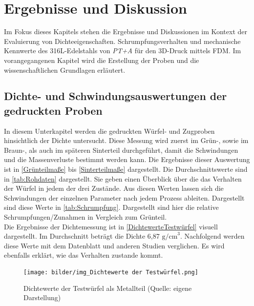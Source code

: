 \chapter{Ergebnisse und Diskussion}

Im Fokus dieses Kapitels stehen die Ergebnisse und Diskussionen im Kontext der Evaluierung von Dichteeigenschaften. Schrumpfungsverhalten und mechanische Kennwerte des 316L-Edelstahls von \textit{PT+A} für den 3D-Druck mittels FDM. Im vorangegangenen Kapitel wird die Erstellung der Proben und die wissenschaftlichen Grundlagen erläutert.

\section{Dichte- und Schwindungsauswertungen der gedruckten Proben}
\label{Dichte- und Schwindung}
In diesem Unterkapitel werden die gedruckten Würfel- und Zugproben hinsichtlich der Dichte untersucht. Diese Messung wird zuerst im Grün-, sowie im Braun-, als auch im späteren Sinterteil durchgeführt, damit die Schwindungen und die Massenverluste bestimmt werden kann. Die Ergebnisse dieser Auswertung ist in \autoref{Grünteilmaße} bis \autoref{Sinterteilmaße} dargestellt. Die Durchschnittswerte sind in \autoref{tab:Rohdaten} dargestellt. Sie geben einen Überblick über die das Verhalten der Würfel in jedem der drei Zustände.
Aus diesen Werten lassen sich die Schwindungen der einzelnen Parameter nach jedem Prozess ableiten. Dargestellt sind diese Werte in \autoref{tab:Schrumpfung}. Dargestellt sind hier die relative Schrumpfungen/Zunahmen in Vergleich zum Grünteil.\\
Die Ergebnisse der Dichtemessung ist in \autoref{DichtewerteTestwürfel} visuell dargestellt. Im Durchschnitt beträgt die Dichte 6,87 \(\text{g/cm}^3\). Nachfolgend werden diese Werte mit dem Datenblatt und anderen Studien verglichen. Es wird ebenfalls erklärt, wie das Verhalten zustande kommt.

\begin{figure}[h] 
  \centering
  \texttt{[image: bilder/img\_Dichtewerte der Testwürfel.png]}
        \caption[Dichtewerte der Testwürfel als Metallteil] {Dichtewerte der Testwürfel als Metallteil (Quelle: eigene Darstellung)}
  \label{DichtewerteTestwürfel}
\end{figure}



